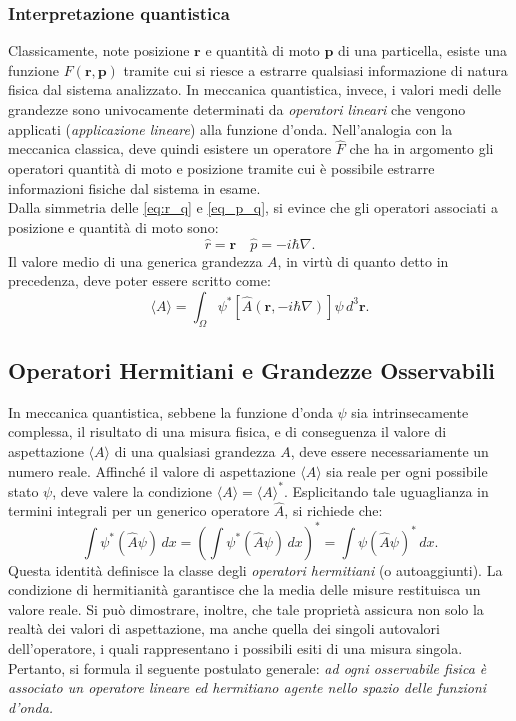 \documentclass[a4paper,11pt]{report}
\begin{document}
\subsubsection{Interpretazione quantistica}
Classicamente, note posizione $\bm{r}$ e quantità di moto $\bm{p}$ di una particella, esiste una funzione $F(\bm{r}, \bm{p})$ tramite cui si riesce a estrarre qualsiasi informazione di natura fisica dal sistema analizzato. In meccanica quantistica, invece, i valori medi delle grandezze sono univocamente determinati da \textit{operatori lineari} che vengono applicati (\textit{applicazione lineare}) alla funzione d'onda. Nell'analogia con la meccanica classica, deve quindi esistere un operatore $\hat{F}$ che ha in argomento gli operatori quantità di moto e posizione tramite cui è possibile estrarre informazioni fisiche dal sistema in esame. \\

\noindent 
Dalla simmetria delle \eqref{eq:r_q} e \eqref{eq_p_q}, si evince che gli operatori associati a posizione e quantità di moto sono:
\begin{equation}
    \hat{r} = \bm{r} \quad \hat{p} = -i\hbar \nabla.
    \end{equation}
Il valore medio di una generica grandezza ${A}$, in virtù di quanto detto in precedenza, deve poter essere scritto come: 
\begin{equation}
    \langle {A} \rangle = \int_\Omega \psi^* [ \hat{A}(\bm{r}, -i\hbar \nabla)] \psi \, d^3\bm{r}.
\end{equation}

\subsection{Operatori Hermitiani e Grandezze Osservabili}
In meccanica quantistica, sebbene la funzione d'onda $\psi$ sia intrinsecamente complessa, il risultato di una misura fisica, e di conseguenza il valore di aspettazione $\langle A \rangle$ di una qualsiasi grandezza $A$, deve essere necessariamente un numero reale.
Affinché il valore di aspettazione $\langle A \rangle$ sia reale per ogni possibile stato $\psi$, deve valere la condizione $\langle A \rangle = \langle A \rangle^*$. Esplicitando tale uguaglianza in termini integrali per un generico operatore $\hat{A}$, si richiede che:
\begin{equation}
    \int \psi^* (\hat{A} \psi) \, dx = \left( \int \psi^* (\hat{A} \psi) \, dx \right)^* = \int \psi (\hat{A} \psi)^* \, dx.
\end{equation}
Questa identità definisce la classe degli \textit{operatori hermitiani} (o autoaggiunti).
La condizione di hermitianità garantisce che la media delle misure restituisca un valore reale. Si può dimostrare, inoltre, che tale proprietà assicura non solo la realtà dei valori di aspettazione, ma anche quella dei singoli autovalori dell'operatore, i quali rappresentano i possibili esiti di una misura singola.
Pertanto, si formula il seguente postulato generale: \textit{ad ogni osservabile fisica è associato un operatore lineare ed hermitiano agente nello spazio delle funzioni d'onda.}
\end{document}
